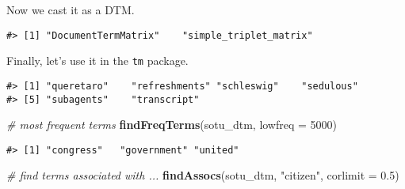 \documentclass[]{book}
\newenvironment{Shaded}{\begin{snugshade}}{\end{snugshade}}
\newcommand{\CommentTok}[1]{\textcolor[rgb]{0.56,0.35,0.01}{\textit{#1}}}
\newcommand{\DataTypeTok}[1]{\textcolor[rgb]{0.13,0.29,0.53}{#1}}
\newcommand{\DecValTok}[1]{\textcolor[rgb]{0.00,0.00,0.81}{#1}}
\newcommand{\FloatTok}[1]{\textcolor[rgb]{0.00,0.00,0.81}{#1}}
\newcommand{\KeywordTok}[1]{\textcolor[rgb]{0.13,0.29,0.53}{\textbf{#1}}}
\newcommand{\NormalTok}[1]{#1}
\newcommand{\OperatorTok}[1]{\textcolor[rgb]{0.81,0.36,0.00}{\textbf{#1}}}
\newcommand{\StringTok}[1]{\textcolor[rgb]{0.31,0.60,0.02}{#1}}
\begin{document}
Now we cast it as a DTM.

\begin{Shaded}
\end{Shaded}

\begin{verbatim}
#> [1] "DocumentTermMatrix"    "simple_triplet_matrix"
\end{verbatim}

Finally, let's use it in the \texttt{tm} package.

\begin{Shaded}
\end{Shaded}

\begin{verbatim}
#> [1] "queretaro"    "refreshments" "schleswig"    "sedulous"    
#> [5] "subagents"    "transcript"
\end{verbatim}

\begin{Shaded}
\begin{Highlighting}[]
\CommentTok{# most frequent terms}
\KeywordTok{findFreqTerms}\NormalTok{(sotu_dtm, }\DataTypeTok{lowfreq =} \DecValTok{5000}\NormalTok{)}
\end{Highlighting}
\end{Shaded}

\begin{verbatim}
#> [1] "congress"   "government" "united"
\end{verbatim}

\begin{Shaded}
\begin{Highlighting}[]
\CommentTok{# find terms associated with ...}
\KeywordTok{findAssocs}\NormalTok{(sotu_dtm, }\StringTok{"citizen"}\NormalTok{, }\DataTypeTok{corlimit =} \FloatTok{0.5}\NormalTok{)}
\end{Highlighting}
\end{Shaded}
\end{document}
